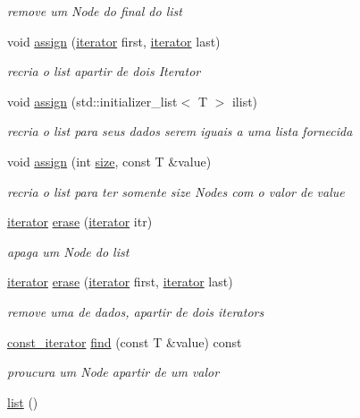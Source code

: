 \begin{DoxyCompactItemize}
\begin{DoxyCompactList}\small\item\em remove um Node do final do list \end{DoxyCompactList}\item 
void \hyperlink{classsc_1_1list_ab30166ee75b611d9c935865f43c5fa69}{assign} (\hyperlink{classsc_1_1list_1_1iterator}{iterator} first, \hyperlink{classsc_1_1list_1_1iterator}{iterator} last)
\begin{DoxyCompactList}\small\item\em recria o list apartir de dois Iterator \end{DoxyCompactList}\item 
void \hyperlink{classsc_1_1list_a495ac9f4a80b40ba7d37e6badf24445f}{assign} (std\+::initializer\+\_\+list$<$ T $>$ ilist)
\begin{DoxyCompactList}\small\item\em recria o list para seus dados serem iguais a uma lista fornecida \end{DoxyCompactList}\item 
void \hyperlink{classsc_1_1list_a1e4e7bb73cb4f1e00cc4eed40ef326d2}{assign} (int \hyperlink{classsc_1_1list_aee0e60e25f8a119956ab55cf126a8cf2}{size}, const T \&value)
\begin{DoxyCompactList}\small\item\em recria o list para ter somente size Nodes com o valor de value \end{DoxyCompactList}\item 
\hyperlink{classsc_1_1list_1_1iterator}{iterator} \hyperlink{classsc_1_1list_a2dd7a74a6b6cfb7e54f61de938161d75}{erase} (\hyperlink{classsc_1_1list_1_1iterator}{iterator} itr)
\begin{DoxyCompactList}\small\item\em apaga um Node do list \end{DoxyCompactList}\item 
\hyperlink{classsc_1_1list_1_1iterator}{iterator} \hyperlink{classsc_1_1list_ae796301c82f58d72d10ec7c30fb0b024}{erase} (\hyperlink{classsc_1_1list_1_1iterator}{iterator} first, \hyperlink{classsc_1_1list_1_1iterator}{iterator} last)
\begin{DoxyCompactList}\small\item\em remove uma de dados, apartir de dois iterators \end{DoxyCompactList}\item 
\hyperlink{classsc_1_1list_1_1const__iterator}{const\+\_\+iterator} \hyperlink{classsc_1_1list_aeaffe3f5ad8090546b9ee5c593077e3c}{find} (const T \&value) const 
\begin{DoxyCompactList}\small\item\em proucura um Node apartir de um valor \end{DoxyCompactList}\item 
\hyperlink{classsc_1_1list_ac7b95807230114dc58f2b1156cb3cdba}{list} ()\hypertarget{classsc_1_1list_ac7b95807230114dc58f2b1156cb3cdba}{}\label{classsc_1_1list_ac7b95807230114dc58f2b1156cb3cdba}


\end{DoxyCompactItemize}
